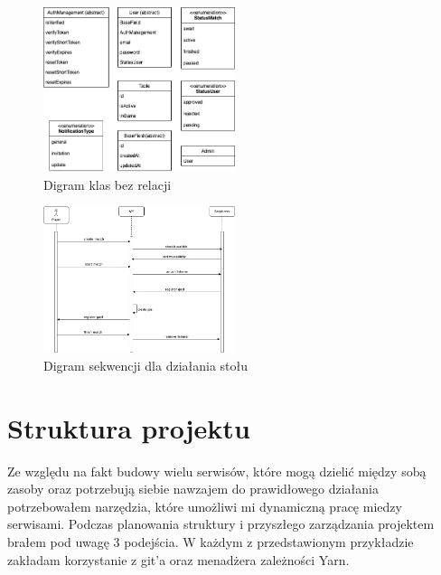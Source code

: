 \begin{figure}[h!]
  \centering
    \includegraphics[width=0.5\textwidth]{images/diagrams/class_diagram_rest.png}
  \caption{Digram klas bez relacji}
  \label{fig:mobile}
\end{figure}

\begin{figure}[h!]
  \centering
    \includegraphics[width=0.5\textwidth]{images/diagrams/match_event_flow.png}
  \caption{Digram sekwencji dla działania stołu}
  \label{fig:mobile}
\end{figure}

\section{Struktura projektu}
Ze względu na fakt budowy wielu serwisów, które mogą dzielić między sobą zasoby oraz potrzebują siebie nawzajem do prawidłowego działania potrzebowałem narzędzia, które umożliwi mi dynamiczną pracę miedzy serwisami. Podczas planowania struktury i przyszłego zarządzania projektem brałem pod uwagę 3 podejścia. W każdym z przedstawionym przykładzie zakładam korzystanie z git'a oraz menadżera zależności Yarn.

